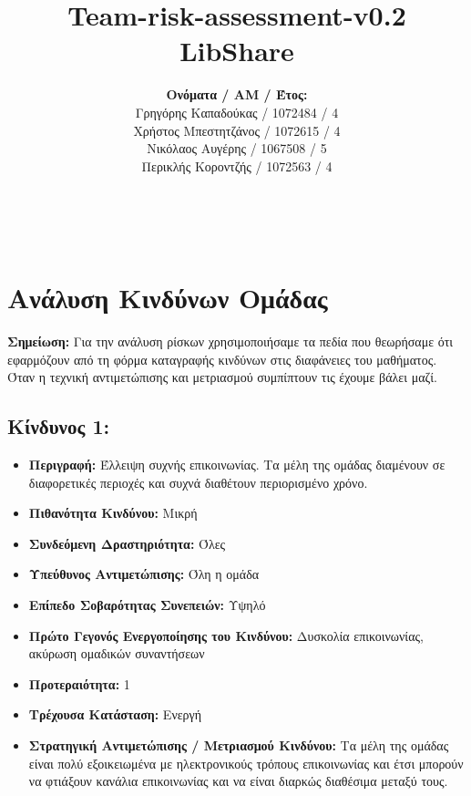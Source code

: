 \documentclass[12pt,a4paper]{article}
\title{Team-risk-assessment-v0.2\\ LibShare}
\author{\textbf{Ονόματα / ΑΜ / Έτος:} \\ Γρηγόρης Καπαδούκας / 1072484 / 4\textdegree \\ Χρήστος Μπεστητζάνος / 1072615 / 4\textdegree \\ Νικόλαος Αυγέρης / 1067508 / 5\textdegree \\ Περικλής Κοροντζής / 1072563 / 4\textdegree}
\begin{document}
\makeatletter
\begin{center}
	\LARGE{\@title} \\
	\pagebreak
    \begin{LARGE}\@author\end{LARGE}
    \pagebreak
\end{center}

\section{Ανάλυση Κινδύνων Ομάδας}

\textbf{Σημείωση:} Για την ανάλυση ρίσκων χρησιμοποιήσαμε τα πεδία που θεωρήσαμε ότι εφαρμόζουν από τη φόρμα καταγραφής κινδύνων στις διαφάνειες του μαθήματος. Όταν η τεχνική αντιμετώπισης και μετριασμού συμπίπτουν τις έχουμε βάλει μαζί.

\subsection*{Κίνδυνος 1:}
\begin{itemize}
	\item \textbf{Περιγραφή:} Έλλειψη συχνής επικοινωνίας. Τα μέλη της ομάδας διαμένουν σε διαφορετικές περιοχές και συχνά διαθέτουν περιορισμένο χρόνο.
	\item \textbf{Πιθανότητα Κινδύνου:} Μικρή
	\item \textbf{Συνδεόμενη Δραστηριότητα:} Όλες
	\item \textbf{Υπεύθυνος Αντιμετώπισης:} Όλη η ομάδα
	\item \textbf{Επίπεδο Σοβαρότητας Συνεπειών:} Υψηλό
	\item \textbf{Πρώτο Γεγονός Ενεργοποίησης του Κινδύνου:} Δυσκολία επικοινωνίας, ακύρωση ομαδικών συναντήσεων
	\item \textbf{Προτεραιότητα:} 1
	\item \textbf{Τρέχουσα Κατάσταση:} Ενεργή
	\item \textbf{Στρατηγική Αντιμετώπισης / Μετριασμού Κινδύνου:} Τα μέλη της ομάδας είναι  πολύ εξοικειωμένα με ηλεκτρονικούς τρόπους επικοινωνίας και έτσι μπορούν να φτιάξουν κανάλια επικοινωνίας και να είναι διαρκώς διαθέσιμα μεταξύ τους. 
\end{itemize}
\end{document}
